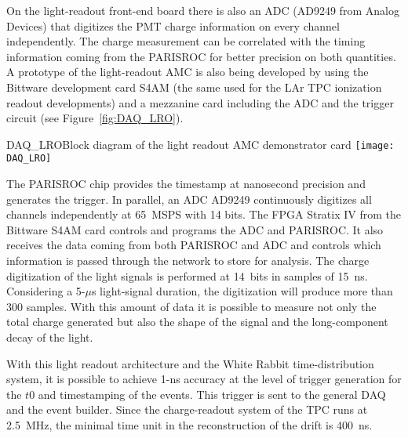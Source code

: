 On the light-readout front-end board there is also an ADC (AD9249 from
Analog Devices) that digitizes the PMT charge information on every
channel independently. The charge measurement can be correlated with
the timing information coming from the PARISROC for better precision
on both quantities. A prototype of the light-readout AMC is also being
developed by using the Bittware development card S4AM (the same used
for the LAr TPC ionization readout developments) and a mezzanine card
including the ADC and the trigger circuit (see
Figure~\ref{fig:DAQ_LRO}).
\begin{cdrfigure}{DAQ_LRO}{Block diagram of the light readout AMC demonstrator card}
 \texttt{[image: DAQ\_LRO]}  
\end{cdrfigure}

The PARISROC chip provides the timestamp at nanosecond precision and
generates the trigger. In parallel, an ADC AD9249 continuously
digitizes all channels independently at 65~MSPS with 14 bits. The FPGA
Stratix IV from the Bittware S4AM card controls and programs the ADC
and PARISROC. It also receives the data coming from both PARISROC and
ADC and controls which information is passed through the network to
store for analysis.  The charge digitization of the light signals is
performed at 14~bits in samples of 15~ns. Considering a 5-$\mu$s
light-signal duration, the digitization will produce more than 300
samples. With this amount of data it is possible to measure not only
the total charge generated but also the shape of the signal and the
long-component decay of the light.


With this light readout architecture and the White Rabbit
time-distribution system, it is possible to achieve 1-ns accuracy at
the level of trigger generation for the $t0$ and timestamping of the
events. This trigger is sent to the general DAQ and the event
builder. Since the charge-readout system of the TPC runs at 2.5~MHz,
the minimal time unit in the reconstruction of the drift is 400~ns.
